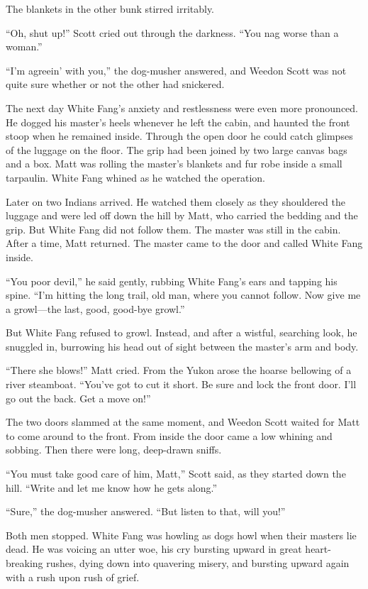 \documentclass[10pt]{book}
\begin{document}
The blankets in the other bunk stirred irritably.

“Oh, shut up!” Scott cried out through the darkness. “You nag worse
than a woman.”

“I’m agreein’ with you,” the dog-musher answered, and Weedon Scott was
not quite sure whether or not the other had snickered.

The next day White Fang’s anxiety and restlessness were even more
pronounced. He dogged his master’s heels whenever he left the cabin,
and haunted the front stoop when he remained inside. Through the open
door he could catch glimpses of the luggage on the floor. The grip had
been joined by two large canvas bags and a box. Matt was rolling the
master’s blankets and fur robe inside a small tarpaulin. White Fang
whined as he watched the operation.

Later on two Indians arrived. He watched them closely as they
shouldered the luggage and were led off down the hill by Matt, who
carried the bedding and the grip. But White Fang did not follow them.
The master was still in the cabin. After a time, Matt returned. The
master came to the door and called White Fang inside.

“You poor devil,” he said gently, rubbing White Fang’s ears and tapping
his spine. “I’m hitting the long trail, old man, where you cannot
follow. Now give me a growl—the last, good, good-bye growl.”

But White Fang refused to growl. Instead, and after a wistful,
searching look, he snuggled in, burrowing his head out of sight between
the master’s arm and body.

“There she blows!” Matt cried. From the Yukon arose the hoarse
bellowing of a river steamboat. “You’ve got to cut it short. Be sure
and lock the front door. I’ll go out the back. Get a move on!”

The two doors slammed at the same moment, and Weedon Scott waited for
Matt to come around to the front. From inside the door came a low
whining and sobbing. Then there were long, deep-drawn sniffs.

“You must take good care of him, Matt,” Scott said, as they started
down the hill. “Write and let me know how he gets along.”

“Sure,” the dog-musher answered. “But listen to that, will you!”

Both men stopped. White Fang was howling as dogs howl when their
masters lie dead. He was voicing an utter woe, his cry bursting upward
in great heart-breaking rushes, dying down into quavering misery, and
bursting upward again with a rush upon rush of grief.
\end{document}
